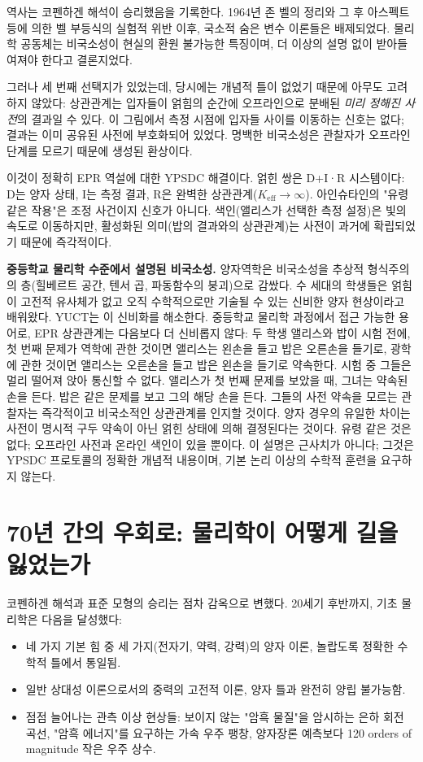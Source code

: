 \documentclass[12pt,a4paper]{article}
\begin{document}
	역사는 코펜하겐 해석이 승리했음을 기록한다. 1964년 존 벨의 정리와 그 후 아스펙트 등에 의한 벨 부등식의 실험적 위반 이후, 국소적 숨은 변수 이론들은 배제되었다. 물리학 공동체는 비국소성이 현실의 환원 불가능한 특징이며, 더 이상의 설명 없이 받아들여져야 한다고 결론지었다.
	
	그러나 세 번째 선택지가 있었는데, 당시에는 개념적 틀이 없었기 때문에 아무도 고려하지 않았다: 상관관계는 입자들이 얽힘의 순간에 오프라인으로 분배된 \emph{미리 정해진 사전}의 결과일 수 있다. 이 그림에서 측정 시점에 입자들 사이를 이동하는 신호는 없다; 결과는 이미 공유된 사전에 부호화되어 있었다. 명백한 비국소성은 관찰자가 오프라인 단계를 모르기 때문에 생성된 환상이다.
	
	이것이 정확히 EPR 역설에 대한 YPSDC 해결이다. 얽힌 쌍은 D+I·R 시스템이다: D는 양자 상태, I는 측정 결과, R은 완벽한 상관관계(\(K_{\mathrm{eff}} \to \infty\)). 아인슈타인의 "유령 같은 작용"은 조정 사건이지 신호가 아니다. 색인(앨리스가 선택한 측정 설정)은 빛의 속도로 이동하지만, 활성화된 의미(밥의 결과와의 상관관계)는 사전이 과거에 확립되었기 때문에 즉각적이다.
	
	\textbf{중등학교 물리학 수준에서 설명된 비국소성.} 양자역학은 비국소성을 추상적 형식주의의 층(힐베르트 공간, 텐서 곱, 파동함수의 붕괴)으로 감쌌다. 수 세대의 학생들은 얽힘이 고전적 유사체가 없고 오직 수학적으로만 기술될 수 있는 신비한 양자 현상이라고 배워왔다. YUCT는 이 신비화를 해소한다. 중등학교 물리학 과정에서 접근 가능한 용어로, EPR 상관관계는 다음보다 더 신비롭지 않다: 두 학생 앨리스와 밥이 시험 전에, 첫 번째 문제가 역학에 관한 것이면 앨리스는 왼손을 들고 밥은 오른손을 들기로, 광학에 관한 것이면 앨리스는 오른손을 들고 밥은 왼손을 들기로 약속한다. 시험 중 그들은 멀리 떨어져 앉아 통신할 수 없다. 앨리스가 첫 번째 문제를 보았을 때, 그녀는 약속된 손을 든다. 밥은 같은 문제를 보고 그의 해당 손을 든다. 그들의 사전 약속을 모르는 관찰자는 즉각적이고 비국소적인 상관관계를 인지할 것이다. 양자 경우의 유일한 차이는 사전이 명시적 구두 약속이 아닌 얽힌 상태에 의해 결정된다는 것이다. 유령 같은 것은 없다; 오프라인 사전과 온라인 색인이 있을 뿐이다. 이 설명은 근사치가 아니다; 그것은 YPSDC 프로토콜의 정확한 개념적 내용이며, 기본 논리 이상의 수학적 훈련을 요구하지 않는다.
	
	\section{70년 간의 우회로: 물리학이 어떻게 길을 잃었는가}
	
	코펜하겐 해석과 표준 모형의 승리는 점차 감옥으로 변했다. 20세기 후반까지, 기초 물리학은 다음을 달성했다:
	\begin{itemize}
		\item 네 가지 기본 힘 중 세 가지(전자기, 약력, 강력)의 양자 이론, 놀랍도록 정확한 수학적 틀에서 통일됨.
		\item 일반 상대성 이론으로서의 중력의 고전적 이론, 양자 틀과 완전히 양립 불가능함.
		\item 점점 늘어나는 관측 이상 현상들: 보이지 않는 "암흑 물질"을 암시하는 은하 회전 곡선, "암흑 에너지"를 요구하는 가속 우주 팽창, 양자장론 예측보다 120 orders of magnitude 작은 우주 상수.
	\end{itemize}
	
\end{document}
